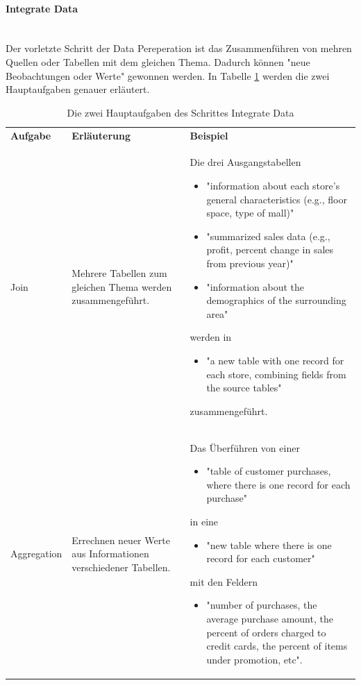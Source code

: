 \paragraph{Integrate Data}\mbox{} \\
Der vorletzte Schritt der Data Pereperation ist das Zusammenführen von mehren Quellen oder Tabellen mit dem gleichen Thema. Dadurch können "neue Beobachtungen oder Werte"\citep[S.~22]{chapman_crisp-dm_2000} gewonnen werden. In Tabelle \ref{tab:integrateData} werden die zwei Hauptaufgaben\citep[S.~17]{shearer_crisp-dm_2000} genauer erläutert.
\begin{table}[H]
\begin{tabular}{|p{2cm}|p{3.5cm}|p{10cm}|}
\hline
\textbf{Aufgabe} & \textbf{Erläuterung} & \textbf{Beispiel}\\
\hhline{===}
Join & Mehrere Tabellen zum gleichen Thema werden zusammengeführt. & Die drei Ausgangstabellen
\begin{itemize}
\item "information about each store’s general characteristics (e.g., floor space, type of mall)"
\item "summarized sales data (e.g., profit, percent change in sales from previous year)"
\item "information about the demographics of the surrounding area"
\end{itemize}
werden in 
\begin{itemize}
\item "a new table with one record for each store, combining fields from the source tables"\citep[S.~16]{shearer_crisp-dm_2000}
\end{itemize}
zusammengeführt. \\ \hline
Aggregation &  Errechnen neuer Werte aus Informationen verschiedener Tabellen. & Das Überführen von einer
\begin{itemize}
\item "table of customer purchases, where there is one record for each purchase"
\end{itemize}
in eine 
\begin{itemize}
\item "new table where there is one record for each customer"
\end{itemize}
mit den Feldern 
\begin{itemize}
\item "number of purchases, the average purchase amount, the percent of orders charged to credit cards, the
percent of items under promotion, etc".\citep[S.~17]{shearer_crisp-dm_2000}
\end{itemize}
\\
   \hline
\end{tabular}
\caption{Die zwei Hauptaufgaben des Schrittes Integrate Data}
\label{tab:integrateData}
\end{table}

